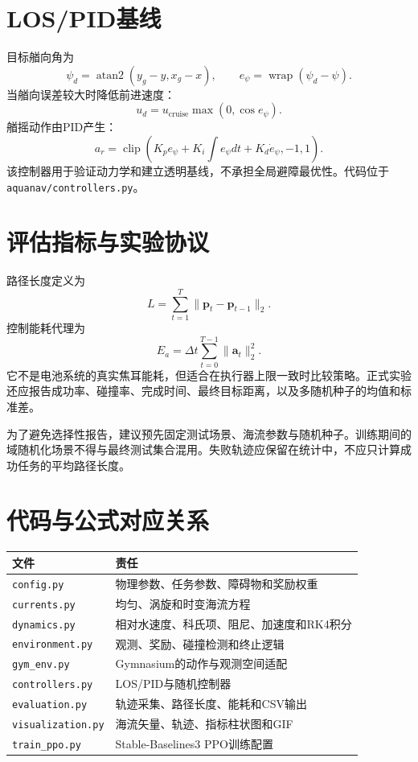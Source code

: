 \documentclass[11pt,a4paper]{ctexart}
\begin{document}
\section{LOS/PID基线}

目标艏向角为
\begin{equation}
\psi_d=\operatorname{atan2}(y_g-y,x_g-x),
\qquad e_\psi=\operatorname{wrap}(\psi_d-\psi).
\end{equation}
当艏向误差较大时降低前进速度：
\begin{equation}
u_d=u_{\mathrm{cruise}}\max(0,\cos e_\psi).
\end{equation}
艏摇动作由PID产生：
\begin{equation}
a_r=\operatorname{clip}
\left(K_pe_\psi+K_i\int e_\psi dt+K_d\dot e_\psi,-1,1\right).
\end{equation}
该控制器用于验证动力学和建立透明基线，不承担全局避障最优性。代码位于\texttt{aquanav/controllers.py}。

\section{评估指标与实验协议}

路径长度定义为
\begin{equation}
L=\sum_{t=1}^{T}\|\bm p_t-\bm p_{t-1}\|_2.
\end{equation}
控制能耗代理为
\begin{equation}
E_a=\Delta t\sum_{t=0}^{T-1}\|\bm a_t\|_2^2.
\end{equation}
它不是电池系统的真实焦耳能耗，但适合在执行器上限一致时比较策略。正式实验还应报告成功率、碰撞率、完成时间、最终目标距离，以及多随机种子的均值和标准差。

为了避免选择性报告，建议预先固定测试场景、海流参数与随机种子。训练期间的域随机化场景不得与最终测试集合混用。失败轨迹应保留在统计中，不应只计算成功任务的平均路径长度。

\section{代码与公式对应关系}

\begin{longtable}{p{}p{}}
\toprule
文件 & 责任\\
\midrule
\texttt{config.py} & 物理参数、任务参数、障碍物和奖励权重\\
\texttt{currents.py} & 均匀、涡旋和时变海流方程\\
\texttt{dynamics.py} & 相对水速度、科氏项、阻尼、加速度和RK4积分\\
\texttt{environment.py} & 观测、奖励、碰撞检测和终止逻辑\\
\texttt{gym\_env.py} & Gymnasium的动作与观测空间适配\\
\texttt{controllers.py} & LOS/PID与随机控制器\\
\texttt{evaluation.py} & 轨迹采集、路径长度、能耗和CSV输出\\
\texttt{visualization.py} & 海流矢量、轨迹、指标柱状图和GIF\\
\texttt{train\_ppo.py} & Stable-Baselines3 PPO训练配置\\
\bottomrule
\end{longtable}
\end{document}
